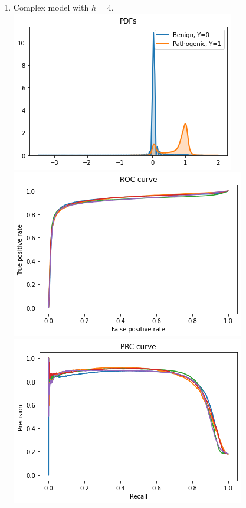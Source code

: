 \documentclass[twoside]{article}
\begin{document}
\begin{enumerate}
		\item Complex model with $h = 4$.\\
		\includegraphics[scale=0.7]{res/img/c4pdf.png}\\
		\includegraphics[scale=0.7]{res/img/c4roc.png}\\
		\includegraphics[scale=0.7]{res/img/c4prc.png}\\
		
	\end{enumerate}
	
\end{document}
